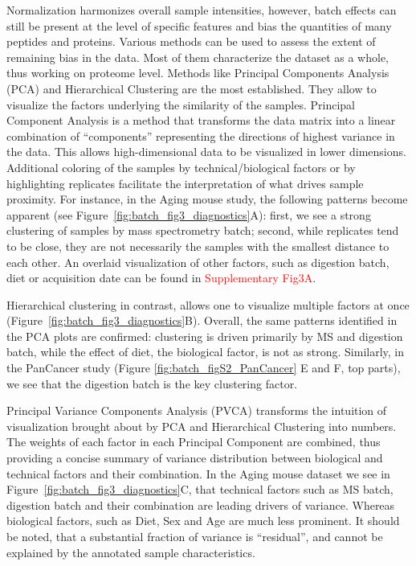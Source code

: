 \documentclass[num-refs]{wiley-article}
\begin{document}
Normalization harmonizes overall sample intensities, however, batch effects can still be present at the level of specific features and bias the quantities of many peptides and proteins.
Various methods can be used to assess the extent of remaining bias in the data. Most of them characterize the dataset as a whole, thus working on proteome level. Methods like Principal Components Analysis (PCA) and Hierarchical Clustering are the most established. They allow to visualize the factors underlying the similarity of the samples.
Principal Component Analysis is a method that transforms the data matrix into a linear combination of “components” representing the directions of highest variance in the data. This allows high-dimensional data to be visualized in lower dimensions. Additional coloring of the samples by technical/biological factors or by highlighting replicates facilitate the interpretation of what drives sample proximity. For instance, in the Aging mouse study, the following patterns become apparent (see Figure~\ref{fig:batch_fig3_diagnostics}A): first, we see a strong clustering of samples by mass spectrometry batch; second, while replicates tend to be close, they are not necessarily the samples with the smallest distance to each other. An overlaid visualization of other factors, such as digestion batch, diet or acquisition date can be found in \textcolor{red}{Supplementary Fig3A}.
 
Hierarchical clustering in contrast, allows one to visualize multiple factors at once (Figure~\ref{fig:batch_fig3_diagnostics}B). Overall, the same patterns identified in the PCA plots are confirmed: clustering is driven primarily by MS and digestion batch, while the effect of diet, the biological factor, is not as strong. Similarly, in the PanCancer study (Figure \ref{fig:batch_figS2_PanCancer} {E and F, top parts}), we see that the digestion batch is the key clustering factor.

Principal Variance Components Analysis (PVCA) transforms the intuition of visualization brought about by PCA and Hierarchical Clustering into numbers. The weights of each factor in each Principal Component are combined, thus providing a concise summary of variance distribution between biological and technical factors and their combination. In the Aging mouse dataset we see in Figure~\ref{fig:batch_fig3_diagnostics}C, that technical factors such as MS batch, digestion batch and their combination are leading drivers of variance. Whereas biological factors, such as Diet, Sex and Age are much less prominent. It should be noted, that a substantial fraction of variance is “residual”, and cannot be explained by the annotated sample characteristics.
\end{document}
